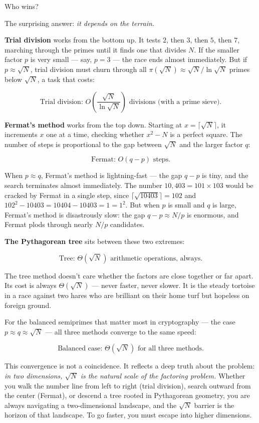 Who wins?

The surprising answer: \emph{it depends on the terrain.}

\textbf{Trial division} works from the bottom up. It tests \(2\), then \(3\), then \(5\), then \(7\), marching through the primes until it finds one that divides \(N\). If the smaller factor \(p\) is very small --- say, \(p = 3\) --- the race ends almost immediately. But if \(p \approx \sqrt{N}\), trial division must churn through all \(\pi(\sqrt{N}) \approx \sqrt{N} / \ln \sqrt{N}\) primes below \(\sqrt{N}\), a task that costs:

\[\text{Trial division: } O\!\left(\frac{\sqrt{N}}{\ln \sqrt{N}}\right) \text{ divisions (with a prime sieve).}\]

\textbf{Fermat's method} works from the top down. Starting at \(x = \lceil \sqrt{N} \rceil\), it increments \(x\) one at a time, checking whether \(x^2 - N\) is a perfect square. The number of steps is proportional to the gap between \(\sqrt{N}\) and the larger factor \(q\):

\[\text{Fermat: } O(q - p) \text{ steps.}\]

When \(p \approx q\), Fermat's method is lightning-fast --- the gap \(q - p\) is tiny, and the search terminates almost immediately. The number \(10{,}403 = 101 \times 103\) would be cracked by Fermat in a single step, since \(\lceil \sqrt{10403} \rceil = 102\) and \(102^2 - 10403 = 10404 - 10403 = 1 = 1^2\). But when \(p\) is small and \(q\) is large, Fermat's method is disastrously slow: the gap \(q - p \approx N/p\) is enormous, and Fermat plods through nearly \(N / p\) candidates.

\textbf{The Pythagorean tree} sits between these two extremes:

\[\text{Tree: } \Theta(\sqrt{N}) \text{ arithmetic operations, always.}\]

The tree method doesn't care whether the factors are close together or far apart. Its cost is always \(\Theta(\sqrt{N})\) --- never faster, never slower. It is the steady tortoise in a race against two hares who are brilliant on their home turf but hopeless on foreign ground.

For the balanced semiprimes that matter most in cryptography --- the case \(p \approx q \approx \sqrt{N}\) --- all three methods converge to the same speed:

\[\text{Balanced case: } \Theta(\sqrt{N}) \text{ for all three methods.}\]

This convergence is not a coincidence. It reflects a deep truth about the problem: \emph{in two dimensions, \(\sqrt{N}\) is the natural scale of the factoring problem.} Whether you walk the number line from left to right (trial division), search outward from the center (Fermat), or descend a tree rooted in Pythagorean geometry, you are always navigating a two-dimensional landscape, and the \(\sqrt{N}\) barrier is the horizon of that landscape. To go faster, you must escape into higher dimensions.


